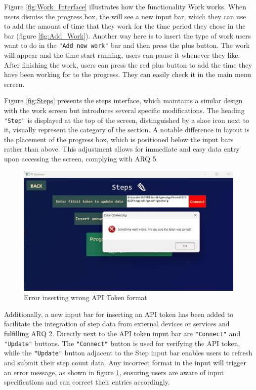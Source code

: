 \documentclass[11pt]{article}
\begin{document}
\newpage

Figure \ref{fig:Work_Interface} illustrates how the functionality Work works. When users dismiss
the progress box, the will see a new input bar, which they can use to add the amount of time that
they work for the time period they chose in the bar (figure \ref{fig:Add_Work}). Another way here
is to insert the type of work users want to do in the \texttt{"Add new work"} bar and then press 
the plus button. The work will appear and the time start running, users can pause it whenever they
like. After finishing the work, users can press the red plus button to add the time they have been
working for to the progress. They can easily check it in the main menu screen.\par

Figure \ref{fig:Steps} presents the steps interface, which maintains a similar design
with the work screen but introduces several specific modifications. The heading \texttt{"Step"} is
displayed at the top of the screen, distinguished by a shoe icon next to it, visually represent the
category of the section. A notable difference in layout is the placement of
the progress box, which is positioned below the input bars rather than above. This adjustment
allows for immediate and easy data entry upon accessing the screen, complying with ARQ 5.\par

\vspace{-7pt}
\begin{figure}[!ht]
  \centering
  \includegraphics[width = 0.5\linewidth]{Error}
  \caption{Error inserting wrong API Token format}
  \label{fig:Error}
\end{figure}
\vspace{-7pt}

Additionally, a new input bar for inserting an API token has been added to facilitate the integration of step data from
external devices or services and fulfilling ARQ 2. Directly next to the API token input bar are \texttt{"Connect"} and 
\texttt{"Update"} buttons. The \texttt{"Connect"} button is used for verifying the API token, while the \texttt{"Update"}
button adjacent to the Step input bar enables users to refresh and submit their step count 
data. Any incorrect format in the input will trigger an error message, as shown in 
figure \ref{fig:Error}, ensuring users are aware of input specifications and can correct their entries accordingly.\par
\end{document}
